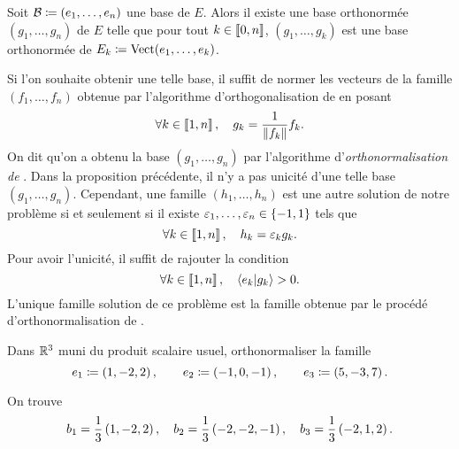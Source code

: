 \documentclass{magnolia}
\begin{document}
\begin{proposition}[nom={Algorithme d'orthonormalisation de \nom{Gram-Schmidt}}]
Soit $\mathcal{B}\coloneqq(e_1,\ldots,e_n)$ une base de $E$. Alors il existe une base
orthonormée $(g_1,\ldots,g_n)$ de $E$ telle que pour tout
$k\in\left\llbracket 0,n\right\rrbracket$,
$(g_1,\ldots,g_k)$ est une base orthonormée de $E_k\coloneqq\operatorname{Vect}(e_1,\ldots,e_k)$.
\end{proposition}

\begin{remarques}
\remarque Si l'on souhaite obtenir une telle base,
  il suffit de normer les vecteurs de la famille $(f_1,\ldots,f_n)$
  obtenue par l'algorithme d'orthogonalisation de  en posant
  \[\forall k\in\left\llbracket 1,n\right\rrbracket,\quad g_k=\frac{1}{\left\|f_k\right\|}f_k.\]
  On dit qu'on a obtenu la base $(g_1,\ldots,g_n)$ par l'algorithme
  d'\emph{orthonormalisation de }.
\remarque Dans la proposition précédente, il n'y a pas unicité d'une telle base
  $(g_1,\ldots,g_n)$. Cependant, une famille $(h_1,\ldots,h_n)$ est une autre solution
  de notre problème si et seulement si il existe $\varepsilon_1,\ldots,\varepsilon_n\in\left\{-1,1\right\}$ tels
  que
  \[\forall k\in\left\llbracket 1,n\right\rrbracket,\quad h_k=\varepsilon_k g_k.\]
\remarque Pour avoir l'unicité, il suffit de rajouter la condition
  \[\forall k\in\left\llbracket 1,n\right\rrbracket,\quad \left\langle {e_k}\middle|{g_k}\right\rangle>0.\]
  L'unique famille solution de ce problème est la famille obtenue par le procédé
  d'orthonormalisation de .
\end{remarques}


\begin{exoUnique}
\exo Dans $\mathbb{R}^3$ muni du produit scalaire usuel, orthonormaliser la
  famille
  \[e_1\coloneqq\left(1,-2,2\right), \qquad e_2\coloneqq\left(-1,0,-1\right), \qquad e_3\coloneqq\left(5,-3,7\right).\]
  \begin{sol}
  On trouve
  \[b_1=\frac{1}{3}\left(1,-2,2\right), \quad b_2=\frac{1}{3}\left(-2,-2,-1\right), \quad
    b_3=\frac{1}{3}\left(-2,1,2\right).\]
  \end{sol}
\end{exoUnique}

\end{document}
